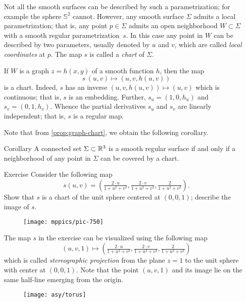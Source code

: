 Not all the smooth surfaces can be described by such a parametrization;
for example the sphere $\mathbb{S}^2$ cannot.
However, any smooth surface $\Sigma$ admits a local parametrization; that is, any point $p\in\Sigma$ admits an open neighborhood $W\subset \Sigma$ with a smooth regular parametrization~$s$.
In this case any point in $W$ can be described by two parameters, usually denoted by $u$ and $v$, 
which are called \emph{local coordinates} at $p$.
The map $s$ is called a \emph{chart} of $\Sigma$.

If $W$ is a graph $z=h(x,y)$ of a smooth function $h$, then the map 
\[s\:(u,v)\mapsto (u,v,h(u,v))\] is a chart.
Indeed, $s$ has an inverse $(u,v,h(u,v))\mapsto (u,v)$ which is continuous;
that is, $s$ is an embedding.
Further,
$s_u=(1,0,h_u)$ and $s_v=(0,1,h_v)$. 
Whence the partial derivatives $s_u$ and $s_v$ are linearly independent;
that is, $s$ is a regular map.

Note that from \ref{prop:graph-chart}, we obtain the following corollary.

\begin{thm}{Corollary}\label{cor:reg-parmeterization}
A connected set $\Sigma\subset \mathbb{R}^3$ is a smooth regular surface if and only if a neighborhood of any point in $\Sigma$ can be covered by a chart.
\end{thm}


\begin{thm}{Exercise}\label{ex:inversion-chart}
Consider the following map 
\[s(u,v)=(\tfrac{2\cdot u}{1+u^2+v^2},\tfrac{2\cdot v}{1+u^2+v^2},\tfrac{2}{1+u^2+v^2}).\]
Show that $s$ is a chart of the unit sphere centered at $(0,0,1)$; describe the image of $s$.
\end{thm}

\begin{wrapfigure}{o}{31 mm}
\vskip-6mm
\centering
\texttt{[image: mppics/pic-750]}
\vskip0mm
\end{wrapfigure}

The map $s$ in the exercise can be visualized using the following map
\[(u,v,1)\mapsto (\tfrac{2\cdot u}{1+u^2+v^2},\tfrac{2\cdot v}{1+u^2+v^2},\tfrac{2}{1+u^2+v^2})\]
which is called \emph{stereographic projection} from the plane $z=1$ to the unit sphere with center at $(0,0,1)$.
Note that the point $(u,v,1)$ and its image lie on the same half-line emerging from the origin. 

\begin{wrapfigure}{o}{31 mm}
\vskip0mm
\centering
\texttt{[image: asy/torus]}
\vskip0mm
\end{wrapfigure}

